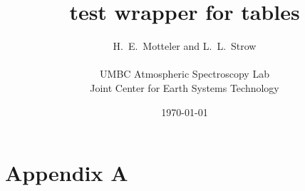 \documentclass[12pt]{article}
\title{test wrapper for tables}
\author{H.~E.~Motteler and L.~L.~Strow \\
  \\
  UMBC Atmospheric Spectroscopy Lab \\
  Joint Center for Earth Systems Technology \\
}
\date{\today}
\begin{document}
\section{Appendix A}


{\scriptsize



}
\end{document}
